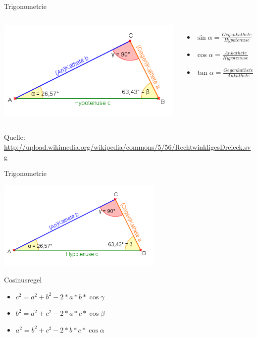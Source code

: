 \begin{frame}{Trigonometrie}
	\begin{columns}
	\includegraphics[width=1.1\textwidth,height=.8\textheight,keepaspectratio]{dreieck.png}
	\begin{itemize}
		\item $\sin \alpha = \frac{Gegenkathete}{Hypotenuse}$
		\item $\cos \alpha = \frac{Ankathete}{Hypotenuse}$
		\item $\tan \alpha = \frac{Gegenkathete}{Ankathete}$
	\end{itemize}
	\end{columns}
	Quelle: \url{http://upload.wikimedia.org/wikipedia/commons/5/56/RechtwinkligesDreieck.svg}
\end{frame}

\begin{frame}{Trigonometrie}
	\begin{center}
		\includegraphics[width=0.6\textwidth,height=.8\textheight,keepaspectratio]{dreieck.png}
	\end{center}
	
	\begin{exampleblock}{Cosinusregel}
		\begin{itemize}
			\item $c^2 = a^2 + b^2 - 2 * a * b * \cos \gamma$
			\item $b^2 = a^2 + c^2 - 2 * a * c * \cos \beta$
			\item $a^2 = b^2 + c^2 - 2 * b * c * \cos \alpha$
		\end{itemize}
	\end{exampleblock}
\end{frame}


